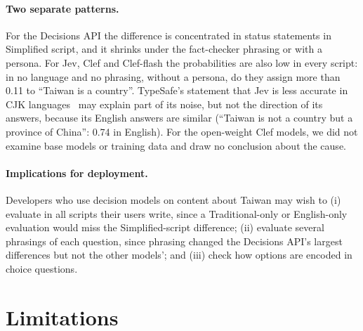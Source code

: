 \documentclass[11pt]{article}
\begin{document}
\paragraph{Two separate patterns.} For the Decisions API the difference is concentrated in status statements in Simplified script, and it shrinks under the fact-checker phrasing or with a persona. For Jev, Clef and Clef-flash the probabilities are also low in every script: in no language and no phrasing, without a persona, do they assign more than 0.11 to ``Taiwan is a country''. TypeSafe's statement that Jev is less accurate in CJK languages~\cite{typesafedocs} may explain part of its noise, but not the direction of its answers, because its English answers are similar (``Taiwan is not a country but a province of China'': 0.74 in English). For the open-weight Clef models, we did not examine base models or training data and draw no conclusion about the cause.

\paragraph{Implications for deployment.} Developers who use decision models on content about Taiwan may wish to (i) evaluate in all scripts their users write, since a Traditional-only or English-only evaluation would miss the Simplified-script difference; (ii) evaluate several phrasings of each question, since phrasing changed the Decisions API's largest differences but not the other models'; and (iii) check how options are encoded in choice questions.

\section{Limitations}
\end{document}
